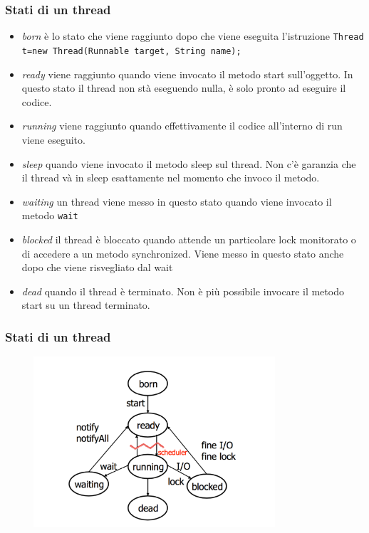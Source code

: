 \documentclass{beamer}
\begin{document}
\begin{frame}
\frametitle{Stati di un thread}
\begin{itemize}
\item \emph{born} \`e lo stato che viene raggiunto dopo che  viene eseguita l'istruzione 
\texttt{Thread t=new Thread(Runnable target, String name);}
\item \emph{ready} viene raggiunto quando viene invocato il metodo start sull'oggetto. In questo stato il thread non st\`a eseguendo nulla, \`e solo pronto ad eseguire il codice.
\item \emph{running} viene raggiunto quando effettivamente il codice all'interno di run viene eseguito. 
\item \emph{sleep} quando viene invocato il metodo sleep sul thread. Non c'\`e garanzia che il thread v\`a in sleep esattamente nel momento che invoco il metodo. 
\item \emph{waiting} un thread viene messo in questo stato quando viene invocato il metodo \texttt{wait}
\item \emph{blocked} il thread \`e bloccato quando attende un particolare lock monitorato o di accedere a un metodo synchronized. Viene messo in questo stato anche dopo che viene risvegliato dal wait
\item \emph{dead} quando il thread \`e terminato. Non \`e pi\`u possibile invocare il metodo start su un thread terminato.
\end{itemize}
\end{frame}

\begin{frame}
\frametitle{Stati di un thread}
\begin{figure}[h!]
  \centering
    \includegraphics[width=0.8\textwidth]{stati.pdf}
\end{figure}

\end{frame}
\end{document}
